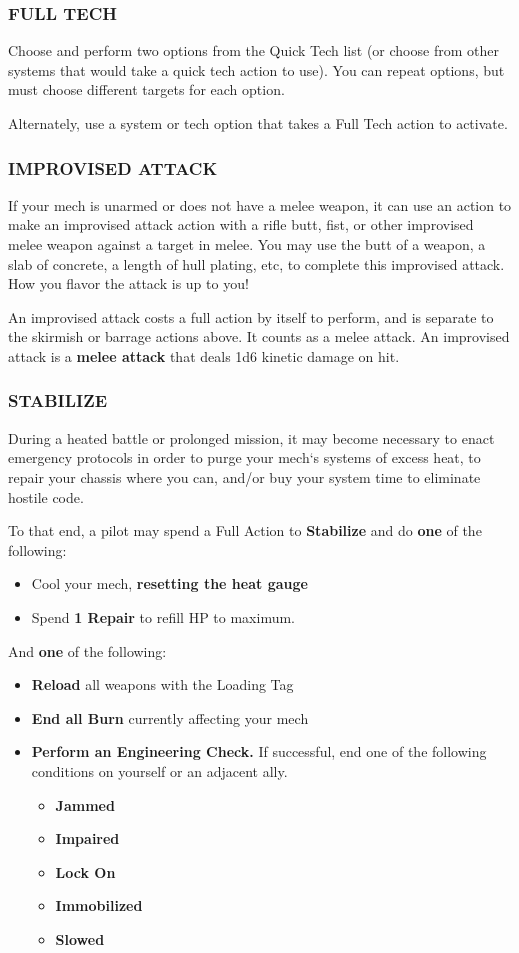 \subsubsection{FULL TECH}
Choose and perform two options from the Quick Tech list (or choose from other systems that would take a quick tech action to use). You can repeat options, but must choose different targets for each option.

Alternately, use a system or tech option that takes a Full Tech action to activate.

\subsubsection{IMPROVISED ATTACK}

If your mech is unarmed or does not have a melee weapon, it can use an action to make an improvised attack action with a rifle butt, fist, or other improvised melee weapon against a target in melee. You may use the butt of a weapon, a slab of concrete, a length of hull plating, etc, to complete this improvised attack. How you flavor the attack is up to you!

An improvised attack costs a full action by itself to perform, and is separate to the skirmish or barrage actions above. It counts as a melee attack. An improvised attack is a \textbf{melee attack} that deals 1d6 kinetic damage on hit.

\subsubsection{STABILIZE}
During a heated battle or prolonged mission, it may become necessary to enact emergency protocols in order to purge your mech‘s systems of excess heat, to repair your chassis where you can, and/or buy your system time to eliminate hostile code.

To that end, a pilot may spend a Full Action to \textbf{Stabilize} and do \textbf{one} of the following:
\begin{itemize}
    \item Cool your mech, \textbf{resetting the heat gauge}
    \item Spend \textbf{1 Repair} to refill HP to maximum.
\end{itemize}
And \textbf{one} of the following:
\begin{itemize}
    \item \textbf{Reload} all weapons with the Loading Tag
    \item \textbf{End all Burn} currently affecting your mech
    \item \textbf{Perform an Engineering Check.} If successful, end one of the following conditions on yourself or an adjacent ally.
    \begin{itemize}
    \item \textbf{Jammed}
    \item \textbf{Impaired}
    \item \textbf{Lock On}
    \item \textbf{Immobilized}
    \item \textbf{Slowed}
\end{itemize}
\end{itemize}

